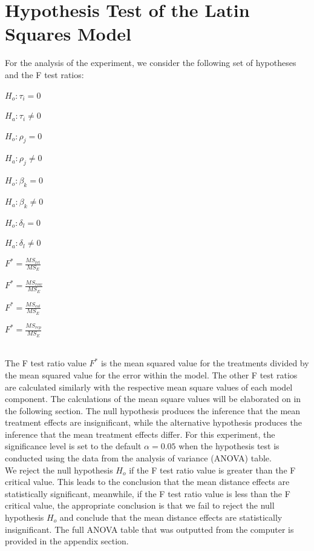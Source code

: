 \section{Hypothesis Test of the Latin Squares Model}
For the analysis of the experiment, we consider the following set of hypotheses and the F test ratios\cite{key3}:\\
\centerline{$H_o: \tau_{i} = 0$}\newline
\centerline{$H_a: \tau_{i} \neq 0$}\newline
\centerline{$H_o: \rho_{j} = 0$}\newline
\centerline{$H_a: \rho_{j} \neq 0$}\newline
\centerline{$H_o: \beta_{k} = 0$}\newline
\centerline{$H_a: \beta_{k} \neq 0$}\newline
\centerline{$H_o: \delta_{l} = 0$}\newline
\centerline{$H_a: \delta_{l} \neq 0$}\newline
\centerline{$F^* = \frac{MS_{trt}}{MS_{E}}$}\newline
\centerline{$F^* = \frac{MS_{row}}{MS_{E}}$}\newline
\centerline{$F^* = \frac{MS_{col}}{MS_{E}}$}\newline
\centerline{$F^* = \frac{MS_{rep}}{MS_{E}}$}\\
The F test ratio value $F^*$ is the mean squared value for the treatments divided by the mean squared value for the error within the model. The other F test ratios are calculated similarly with the respective mean square values of each model component. The calculations of the mean square values will be elaborated on in the following section. The null hypothesis produces the inference that the mean treatment effects are insignificant, while the alternative hypothesis produces the inference that the mean treatment effects differ. For this experiment, the significance level is set to the default $\alpha = 0.05$ when the hypothesis test is conducted using the data from the analysis of variance (ANOVA) table.\\
We reject the null hypothesis $H_o$ if the F test ratio value is greater than the F critical value. This leads to the conclusion that the mean distance effects are statistically significant, meanwhile, if the F test ratio value is less than the F critical value, the appropriate conclusion is that we fail to reject the null hypothesis $H_o$ and conclude that the mean distance effects are statistically insignificant. The full ANOVA table that was outputted from the computer is provided in the appendix section.

